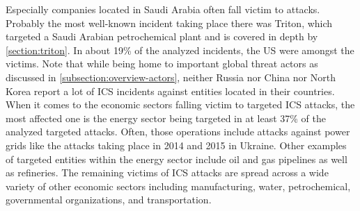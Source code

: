\documentclass[runningheads]{llncs}
\begin{document}
Especially companies located in Saudi Arabia often fall victim to attacks.
Probably the most well-known incident taking place there was Triton, which targeted a Saudi Arabian petrochemical plant and is covered in depth by \autoref{section:triton}.
In about 19\% of the analyzed incidents, the US were amongst the victims.
Note that while being home to important global threat actors as discussed in \autoref{subsection:overview-actors}, neither Russia nor China nor North Korea report a lot of ICS incidents against entities located in their countries.
\\
When it comes to the economic sectors falling victim to targeted ICS attacks, the most affected one is the energy sector being targeted in at least 37\% of the analyzed targeted attacks.
Often, those operations include attacks against power grids like the attacks taking place in 2014 and 2015 in Ukraine.
Other examples of targeted entities within the energy sector include oil and gas pipelines as well as refineries.
The remaining victims of ICS attacks are spread across a wide variety of other economic sectors including manufacturing, water, petrochemical, governmental organizations, and transportation.
\end{document}
